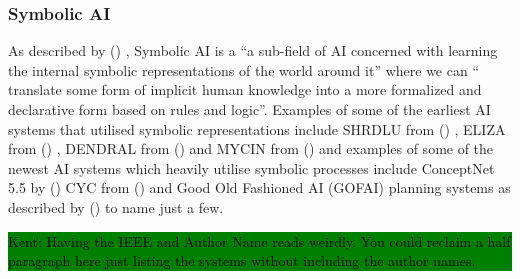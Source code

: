 \documentclass[hf]{ceurart}
\newcommand{\citeauthornum}[1]{\citeauthor{#1} (\citeyear{#1}) \cite{#1}}
\newcommand{\pinaforecomment}[4]{\colorbox{#1}{\textcolor{#4}{\parbox{.8\linewidth}{#2: #3}}}}
\newcommand{\osullikomment}[1]{\pinaforecomment{green}{Kent}{#1}{black}}
\begin{document}
\subsubsection{\textbf{Symbolic AI}}\label{subsub:symbolic-AI}
As described by \citeauthornum{Dingli2023}, Symbolic AI is a \enquote{a sub-field of AI concerned with learning the internal symbolic representations of the world around it} where we can \enquote{ translate some form of implicit human knowledge into a more formalized and declarative form based on rules and logic}. Examples of some of the earliest AI systems that utilised symbolic representations include SHRDLU from \citeauthornum{SHRDLU}, ELIZA from \citeauthornum{Weizenbaum1966},  DENDRAL from \citeauthornum{Lindsay1980} and MYCIN from \citeauthornum{Melle1978} and examples of some of the newest AI systems which heavily utilise symbolic processes include ConceptNet 5.5 by \citeauthornum{Speer2016} CYC from \citeauthornum{Lenat2023} and Good Old Fashioned AI (GOFAI) planning systems as described by \citeauthornum{Edelkamp2004} to name just a few.
\osullikomment{Having the IEEE and Author Name reads weirdly. You could reclaim a half paragraph here just listing the systems without including the author names.}
\end{document}
